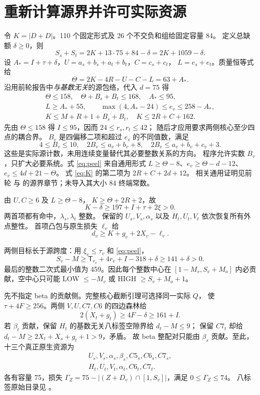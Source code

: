 \documentclass[11pt,a4paper]{article}
\newcommand{\T}{\mathsf T}
\newcommand{\A}{A_*}
\begin{document}
\section{重新计算源界并许可实际资源}
令 $K=|D+D|$。110 个固定形式及 26 个不交负和组给固定容量 84。
定义总缺额 $\delta\ge0$，则
\[
 S_s+S_t=2K+13\cdot75+84-\delta=2K+1059-\delta.
\]
设 $\A=I+\tau+\delta$，$U=a_s+b_s+a_t+b_t$，$C=c_s+c_t$，
$L=e_s+e_t$。质量恒等式给
\[
 \Theta=2K-4R-U-C-L=63+\A.
\]
沿用前轮报告中\emph{与基数无关}的源包络，代入 $d=75$ 得
\begin{gather}
 \Theta\le158,\quad \Theta+B_s+B_t\le168,\quad \A\le95,\label{eq:source}\\
 L\ge\A+55,\qquad \max(4,\A-24)\le e_v\le258-\A,\label{eq:peel}\\
 K\le M+R+1+B_s+B_t,\quad K\le2R+C+162.\label{eq:K}
\end{gather}
先由 $\Theta\le158$ 得 $I\le95$，因而 $24\le r_s,r_t\le42$；
随后才应用要求两侧核心至少四点的耦合界。
$B_v$ 是四偏移二项和超过 $e_v$ 的不同值数，满足
\[
4\le B_v\le10,\quad2B_v\le a_v+b_v+8,\quad
2B_v\le a_v+b_v+c_v+3.
\]
这些是实际源计数，未用连续变量替代其必要整数关系的方向。
程序允许实数 $B_v$，只扩大必要系统。式 \eqref{eq:peel} 来自通用形式
$L\ge\Theta-8$、$e_v\ge\Theta-d-12$、$e_v\le4d+21-\Theta$。
式 \eqref{eq:K} 的第二项为 $2R+C+2d+12$。
相关通用证明见前轮
 与
 的源界章节；未导入其大小 84 终端常数。

由 $U,C\ge6$ 及 $L\ge\Theta-8$，
$K\ge\Theta+2R+2$，故
\[
 K-\delta\ge197+I+\tau+2\xi>0.
\]
两首项都有命中，$\lambda_s,\lambda_t$ 整数。
保留的 $U_s,V_s,\alpha_s$ 以及 $H_t,U_t,V_t$ 依次恢复所有外点整性。
首项凸包与原生损失 $\ell_v$ 给
\begin{equation}
 d_v\ge K+g_v+2X_v-\ell_v.\label{eq:leading}
\end{equation}

两侧目标长于源跨度：用 $\xi_v\le\tau_v$ 和 \eqref{eq:peel}，
\[
 S_v-M\ge\T_{r_v}+4r_v+I-318+\delta\ge141+\delta>0.
\]
最后的整数二次式最小值为 459。因此每个整数中心在
$[1-M_v,S_v+M_o]$ 内必贡献，空中心只可能 LOW $\le-M_v$ 或
HIGH $\ge S_v+M_o+1$。

先不指定 beta 的贡献侧。完整核心截断引理可选择同一实际 $Q$，
使 $\tau+4F\ge256$。两侧 $V,U,C7,C6$ 的四边森林给
\[
 2(X_t+g_t)\ge4F-\delta\ge161+I.
\]
若 $\beta_t$ 贡献，保留 $H_t$ 的基数无关八标签空隙界给 $d_t-M\le9$；
保留 $C7_t$ 却给 $d_t-M\ge2X_t+X_s+g_t+1>9$，矛盾。
故 beta 整配对只能由 $\beta_s$ 贡献。至此，十三个真正原生资源为
\begin{gather*}
 U_s,V_s,\alpha_s,\beta_s,C5_s,C6_s,C7_s,\\
 H_t,U_t,V_t,\alpha_t,C6_t,C7_t.
\end{gather*}
各有容量 75，损失 $\Gamma_Z=75-|(Z+D_v)\cap[1,S_v]|$，满足 $0\le\Gamma_Z\le74$。
八标签原始目录见
。
\end{document}
